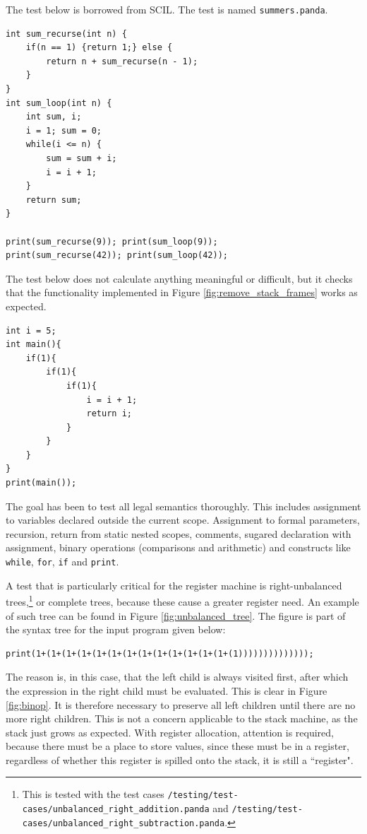 The test below is borrowed from SCIL. The test is named \texttt{summers.panda}.

\begin{verbatim}
int sum_recurse(int n) {
    if(n == 1) {return 1;} else {
        return n + sum_recurse(n - 1);
    }
}
int sum_loop(int n) {
    int sum, i;
    i = 1; sum = 0;
    while(i <= n) {
        sum = sum + i;
        i = i + 1;
    }
    return sum;
}

print(sum_recurse(9)); print(sum_loop(9));
print(sum_recurse(42)); print(sum_loop(42));
\end{verbatim}

The test below does not calculate anything meaningful or difficult, but it checks that the functionality implemented in Figure \ref{fig:remove_stack_frames} works as expected.

\begin{verbatim}
int i = 5;
int main(){
    if(1){
        if(1){
            if(1){
                i = i + 1;
                return i;
            }
        }
    }
}
print(main());
\end{verbatim}

The goal has been to test all legal semantics thoroughly. This includes assignment to variables declared outside the current scope. Assignment to formal parameters, recursion, return from static nested scopes, comments, sugared declaration with assignment, binary operations (comparisons and arithmetic) and constructs like \texttt{while}, \texttt{for}, \texttt{if} and \texttt{print}.

A test that is particularly critical for the register machine is right-unbalanced trees,\footnote{This is tested with the test cases \texttt{/testing/test-cases/unbalanced\_right\_addition.panda} and \texttt{/testing/test-cases/unbalanced\_right\_subtraction.panda}.} or complete trees, because these cause a greater register need. An example of such tree can be found in Figure \ref{fig:unbalanced_tree}. The figure is part of the syntax tree for the input program given below:

\begin{verbatim}
print(1+(1+(1+(1+(1+(1+(1+(1+(1+(1+(1+(1+(1+(1))))))))))))));
\end{verbatim}

The reason is, in this case, that the left child is always visited first, after which the expression in the right child must be evaluated. This is clear in Figure \ref{fig:binop}. It is therefore necessary to preserve all left children until there are no more right children. This is not a concern applicable to the stack machine, as the stack just grows as expected. With register allocation, attention is required, because there must be a place to store values, since these must be in a register, regardless of whether this register is spilled onto the stack, it is still a ``register".

